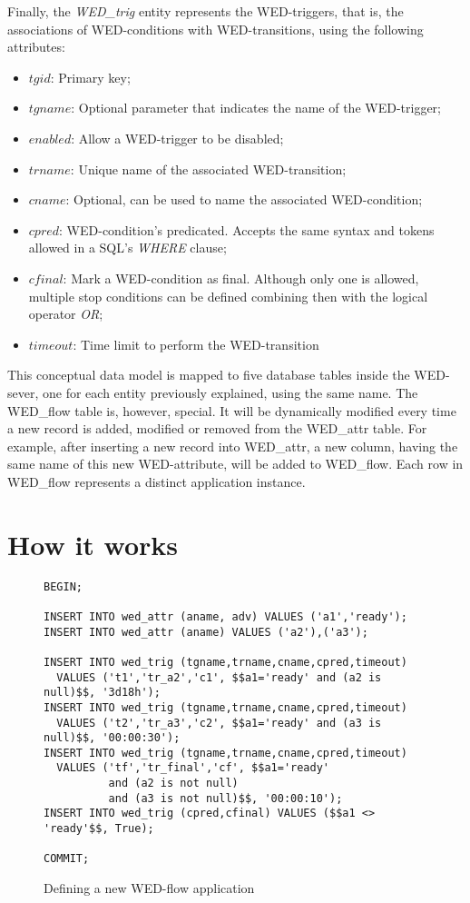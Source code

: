 \documentclass[12pt]{article}
\begin{document}
Finally, the \emph{WED\_trig} entity represents the WED-triggers, that is, the associations of WED-conditions with WED-transitions,
using the following attributes:

\begin{itemize}
\item $tgid$: Primary key; 
\item $tgname$: Optional parameter that indicates the name of the WED-trigger; 
\item $enabled$: Allow a WED-trigger to be disabled;
\item $trname$: Unique name of the associated WED-transition;
\item $cname$: Optional, can be used to name the associated WED-condition; 
\item $cpred$: WED-condition's predicated. Accepts the same syntax and tokens allowed in a SQL's \emph{WHERE} clause;
\item $cfinal$: Mark a WED-condition as final. Although only one is allowed, multiple stop conditions can be defined 
               combining then with the logical operator \emph{OR}; 
\item $timeout$: Time limit to perform the WED-transition 
\end{itemize}

This conceptual data model is mapped to five database tables inside the WED-sever, one for each entity previously explained,
using the same name. The WED\_flow table is, however, special. It will be dynamically modified every time a new record
is added, modified or removed from the WED\_attr table. For example, after inserting a new record into WED\_attr, a new column,
having the same name of this new WED-attribute, will be added to WED\_flow. Each row in WED\_flow represents a distinct application
instance. 

\section{How it works}
\begin{figure}[!t]
\begin{Verbatim}[fontsize=\tiny]
BEGIN;

INSERT INTO wed_attr (aname, adv) VALUES ('a1','ready');
INSERT INTO wed_attr (aname) VALUES ('a2'),('a3');

INSERT INTO wed_trig (tgname,trname,cname,cpred,timeout) 
  VALUES ('t1','tr_a2','c1', $$a1='ready' and (a2 is null)$$, '3d18h');
INSERT INTO wed_trig (tgname,trname,cname,cpred,timeout) 
  VALUES ('t2','tr_a3','c2', $$a1='ready' and (a3 is null)$$, '00:00:30');
INSERT INTO wed_trig (tgname,trname,cname,cpred,timeout) 
  VALUES ('tf','tr_final','cf', $$a1='ready' 
          and (a2 is not null) 
          and (a3 is not null)$$, '00:00:10');
INSERT INTO wed_trig (cpred,cfinal) VALUES ($$a1 <> 'ready'$$, True);

COMMIT;
\end{Verbatim}
\caption{Defining a new WED-flow application}
\label{code_new}
\end{figure}
 
\end{document}
